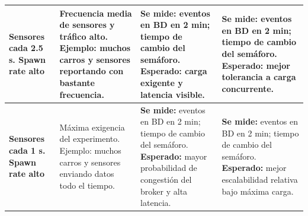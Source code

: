 \documentclass[12pt, a4paper]{article}
\begin{document}
\begin{footnotesize}
\begin{longtable}{|L{2.6cm}|L{3.6cm}|L{3.6cm}|L{3.6cm}|}
\textbf{Sensores cada 2.5 s. Spawn rate alto} &
Frecuencia media de sensores y tráfico alto. Ejemplo: muchos carros y sensores reportando con bastante frecuencia. &
\textbf{Se mide:} eventos en BD en 2 min; tiempo de cambio del semáforo. \textbf{Esperado:} carga exigente y latencia visible. &
\textbf{Se mide:} eventos en BD en 2 min; tiempo de cambio del semáforo. \textbf{Esperado:} mejor tolerancia a carga concurrente. \\
\hline

\textbf{Sensores cada 1 s. Spawn rate alto} &
Máxima exigencia del experimento. Ejemplo: muchos carros y sensores enviando datos todo el tiempo. &
\textbf{Se mide:} eventos en BD en 2 min; tiempo de cambio del semáforo. \textbf{Esperado:} mayor probabilidad de congestión del broker y alta latencia. &
\textbf{Se mide:} eventos en BD en 2 min; tiempo de cambio del semáforo. \textbf{Esperado:} mejor escalabilidad relativa bajo máxima carga. \\
\hline

\end{longtable}
\end{footnotesize}
\end{document}
